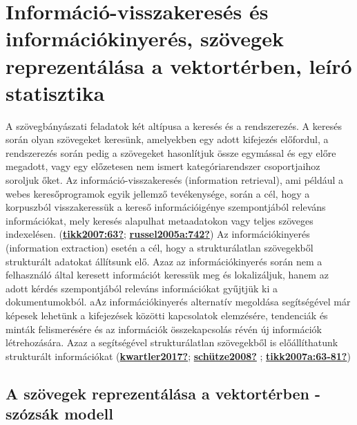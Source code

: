 \documentclass[
]{book}
\begin{document}
\hypertarget{informuxe1ciuxf3-visszakeresuxe9s-uxe9s-informuxe1ciuxf3kinyeruxe9s-szuxf6vegek-reprezentuxe1luxe1sa-a-vektortuxe9rben-leuxedruxf3-statisztika}{%
\chapter{Információ-visszakeresés és információkinyerés, szövegek
reprezentálása a vektortérben, leíró
statisztika}\label{informuxe1ciuxf3-visszakeresuxe9s-uxe9s-informuxe1ciuxf3kinyeruxe9s-szuxf6vegek-reprezentuxe1luxe1sa-a-vektortuxe9rben-leuxedruxf3-statisztika}}

A szövegbányászati feladatok két altípusa a keresés és a rendszerezés. A
keresés során olyan szövegeket keresünk, amelyekben egy adott kifejezés
előfordul, a rendszerezés során pedig a szövegeket hasonlítjuk össze
egymással és egy előre megadott, vagy egy előzetesen nem ismert
kategóriarendszer csoportjaihoz soroljuk őket. Az
információ-visszakeresés (information retrieval), ami például a webes
keresőprogramok egyik jellemző tevékenysége, során a cél, hogy a
korpuszból visszakeressük a kereső információigénye szempontjából
releváns információkat, mely keresés alapulhat metaadatokon vagy teljes
szöveges indexelésen.
(\protect\hyperlink{ref-tikk2007:63}{\textbf{tikk2007:63?}};
\protect\hyperlink{ref-russel2005a:742}{\textbf{russel2005a:742?}}) Az
információkinyerés (information extraction) esetén a cél, hogy a
strukturálatlan szövegekből strukturált adatokat állítsunk elő. Azaz az
információkinyerés során nem a felhasználó által keresett információt
keressük meg és lokalizáljuk, hanem az adott kérdés szempontjából
releváns információkat gyűjtjük ki a dokumentumokból. aAz
információkinyerés alternatív megoldása segítségével már képesek
lehetünk a kifejezések közötti kapcsolatok elemzésére, tendenciák és
minták felismerésére és az információk összekapcsolás révén új
információk létrehozására. Azaz a segítségével strukturálatlan
szövegekből is előállíthatunk strukturált információkat
(\protect\hyperlink{ref-kwartler2017}{\textbf{kwartler2017?}};
\protect\hyperlink{ref-schuxfctze2008}{\textbf{schütze2008?}} ;
\protect\hyperlink{ref-tikk2007a:63-81}{\textbf{tikk2007a:63-81?}})

\hypertarget{a-szuxf6vegek-reprezentuxe1luxe1sa-a-vektortuxe9rben---szuxf3zsuxe1k-modell}{%
\section{A szövegek reprezentálása a vektortérben - szózsák
modell}\label{a-szuxf6vegek-reprezentuxe1luxe1sa-a-vektortuxe9rben---szuxf3zsuxe1k-modell}}
\end{document}
